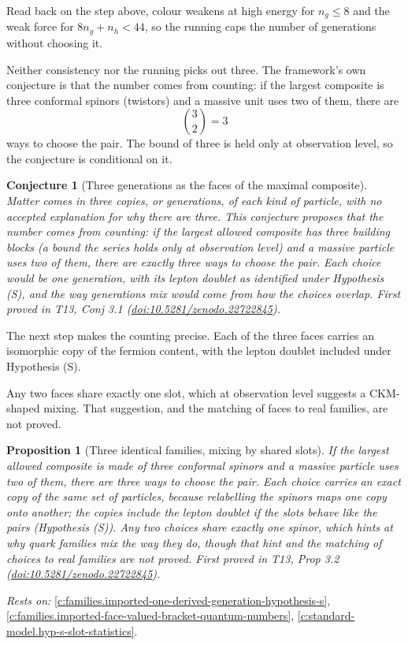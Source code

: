\documentclass[11pt]{article}
\newtheorem{proposition}[theorem]{Proposition}
\newtheorem{conjecture}[theorem]{Conjecture}
\theoremstyle{definition}
\theoremstyle{plain}
\begin{document}
Read back on the step above, colour weakens at high energy for $n_{g} \leq 8$ and the weak force for $8n_{g} + n_{h} < 44$, so the running caps the number of generations without choosing it.

Neither consistency nor the running picks out three. The framework's own conjecture is that the number comes from counting: if the largest composite is three conformal spinors (twistors) and a massive unit uses two of them, there are \[ \binom{3}{2} = 3 \] ways to choose the pair. The bound of three is held only at observation level, so the conjecture is conditional on it.

\begin{conjecture}[Three generations as the faces of the maximal composite]\label{c:families.three-generations-faces-maximal-composite}
Matter comes in three copies, or generations, of each kind of particle, with no accepted explanation for why there are three. This conjecture proposes that the number comes from counting: if the largest allowed composite has three building blocks (a bound the series holds only at observation level) and a massive particle uses two of them, there are exactly three ways to choose the pair. Each choice would be one generation, with its lepton doublet as identified under Hypothesis (S), and the way generations mix would come from how the choices overlap.
\emph{First proved in} T13, Conj 3.1 (\href{https://doi.org/10.5281/zenodo.22722845}{doi:10.5281/zenodo.22722845}).
\end{conjecture}

The next step makes the counting precise. Each of the three faces carries an isomorphic copy of the fermion content, with the lepton doublet included under Hypothesis (S).

Any two faces share exactly one slot, which at observation level suggests a CKM-shaped mixing. That suggestion, and the matching of faces to real families, are not proved.

\begin{proposition}[Three identical families, mixing by shared slots]\label{c:families.three-identical-families-mixing-shared-slots}
If the largest allowed composite is made of three conformal spinors and a massive particle uses two of them, there are three ways to choose the pair. Each choice carries an exact copy of the same set of particles, because relabelling the spinors maps one copy onto another; the copies include the lepton doublet if the slots behave like the pairs (Hypothesis (S)). Any two choices share exactly one spinor, which hints at why quark families mix the way they do, though that hint and the matching of choices to real families are not proved.
\emph{First proved in} T13, Prop 3.2 (\href{https://doi.org/10.5281/zenodo.22722845}{doi:10.5281/zenodo.22722845}).
\end{proposition}
\noindent\emph{Rests on:} \ref{c:families.imported-one-derived-generation-hypothesis-s}, \ref{c:families.imported-face-valued-bracket-quantum-numbers}, \ref{c:standard-model.hyp-s-slot-statistics}.
\end{document}
